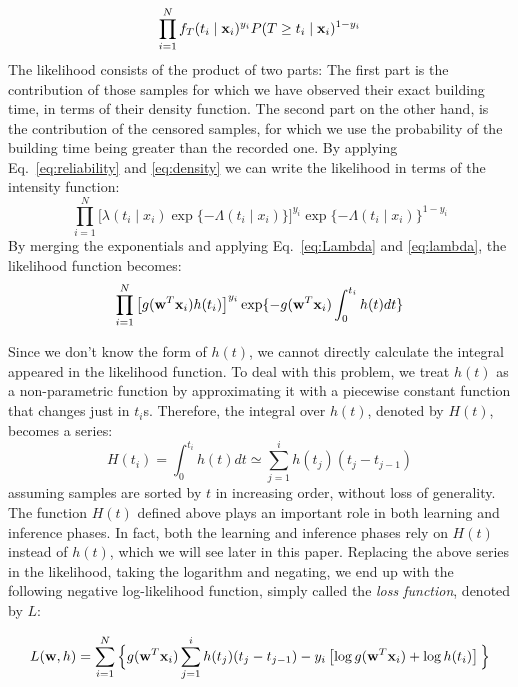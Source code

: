 \begin{equation}
\prod_{i=1}^{N}f_T(t_i\mid \mathbf{x}_i)^{y_i}P(T\ge t_i\mid \mathbf{x}_i)^{1-y_i}\\
\end{equation}
The likelihood consists of the product of two parts: The first part is the contribution of those samples for which we have observed their exact building time, in terms of their density function. The second part on the other hand, is the contribution of the censored samples, for which we use the probability of the building time being greater than the recorded one. {\color{red}By applying Eq.~\ref{eq:reliability} and \ref{eq:density} we can write the likelihood in terms of the intensity function:
\begin{equation}
\prod_{i=1}^{N}\big[\lambda(t_i\mid x_i)\exp\{-\Lambda(t_i\mid x_i)\}\big]^{y_i}\exp\lbrace-\Lambda(t_i\mid x_i)\rbrace^{1-y_i}
\end{equation}
By merging the exponentials and applying Eq.~\ref{eq:Lambda} and \ref{eq:lambda}, the likelihood function becomes:}
\begin{equation}
\prod_{i=1}^{N}\left[g(\mathbf{w}^T\mathbf{x}_i)h(t_i)\right]^{y_i}\exp\lbrace-g(\mathbf{w}^T\mathbf{x}_i)\int_{0}^{t_i}h(t)dt\rbrace
\end{equation}

Since we don't know the form of $h(t)$, we cannot directly calculate the integral appeared in the likelihood function. To deal with this problem, we treat $h(t)$ as a non-parametric function by approximating it with a piecewise constant function that changes just in $t_i$s. Therefore, the integral over $h(t)$, denoted by $H(t)$, becomes a series:
\begin{equation}\label{eq:cumh}
H(t_i)=\int_{0}^{t_i}h(t)dt \simeq \sum_{j=1}^{i}h(t_j)(t_j-t_{j-1})
\end{equation}
assuming samples are sorted by $t$ in increasing order, without loss of generality. The function $H(t)$ defined above plays an important role in both learning and inference phases. In fact, both the learning and inference phases rely on $H(t)$ instead of $h(t)$, which we will see later in this paper.
Replacing the above series in the likelihood, taking the logarithm and negating, we end up with the following {\color{red}negative log-likelihood function, simply called the \emph{loss function}, denoted by $L$}:

\begin{equation}\label{eq:logl}
\begin{split}
L(\mathbf{w},h)
=\sum_{i=1}^{N}\Big\lbrace g(\mathbf{w}^T\mathbf{x}_i)\sum_{j=1}^{i}h(t_j)(t_j-t_{j-1})-y_i\left[\log g(\mathbf{w}^T\mathbf{x}_i) + \log h(t_i)\right]\Big\rbrace\\
\end{split}
\end{equation}

